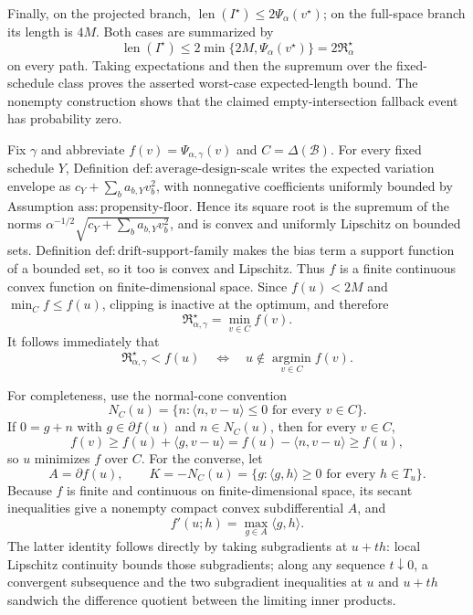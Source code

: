 Finally, on the projected branch,
\(\operatorname{len}(I^\star)\le2\Psi_\alpha(v^\star)\); on the full-space branch its length is \(4M\).  Both cases are summarized by
\[
\operatorname{len}(I^\star)
\le2\min\{2M,\Psi_\alpha(v^\star)\}
=2\mathfrak R_\alpha^\star
\]
on every path.  Taking expectations and then the supremum over the fixed-schedule class proves the asserted worst-case expected-length bound.  The nonempty construction shows that the claimed empty-intersection fallback event has probability zero.

Fix \(\gamma\) and abbreviate \(f(v)=\Psi_{\alpha,\gamma}(v)\) and \(C=\Delta(\mathcal B)\).  For every fixed schedule \(Y\), Definition \(\mathrm{def:average\text{-}design\text{-}scale}\) writes the expected variation envelope as \(c_Y+\sum_ba_{b,Y}v_b^2\), with nonnegative coefficients uniformly bounded by Assumption \(\mathrm{ass:propensity\text{-}floor}\).  Hence its square root is the supremum of the norms
\(\alpha^{-1/2}\sqrt{c_Y+\sum_ba_{b,Y}v_b^2}\), and is convex and uniformly Lipschitz on bounded sets.  Definition \(\mathrm{def:drift\text{-}support\text{-}family}\) makes the bias term a support function of a bounded set, so it too is convex and Lipschitz.  Thus \(f\) is a finite continuous convex function on finite-dimensional space.  Since \(f(u)<2M\) and \(\min_Cf\le f(u)\), clipping is inactive at the optimum, and therefore
\[
\mathfrak R_{\alpha,\gamma}^\star=\min_{v\in C}f(v).
\]
It follows immediately that
\[
\mathfrak R_{\alpha,\gamma}^\star<f(u)
\quad\Longleftrightarrow\quad
u\notin\operatorname*{argmin}_{v\in C}f(v).
\]

For completeness, use the normal-cone convention
\[
N_C(u)=\{n:\langle n,v-u\rangle\le0\text{ for every }v\in C\}.
\]
If \(0=g+n\) with \(g\in\partial f(u)\) and \(n\in N_C(u)\), then for every \(v\in C\),
\[
f(v)\ge f(u)+\langle g,v-u\rangle
=f(u)-\langle n,v-u\rangle\ge f(u),
\]
so \(u\) minimizes \(f\) over \(C\).  For the converse, let
\[
A=\partial f(u),
\qquad
K=-N_C(u)=\{g:\langle g,h\rangle\ge0\text{ for every }h\in T_u\}.
\]
Because \(f\) is finite and continuous on finite-dimensional space, its secant inequalities give a nonempty compact convex subdifferential \(A\), and
\[
f'(u;h)=\max_{g\in A}\langle g,h\rangle.
\]
The latter identity follows directly by taking subgradients at \(u+t h\): local Lipschitz continuity bounds those subgradients; along any sequence \(t\downarrow0\), a convergent subsequence and the two subgradient inequalities at \(u\) and \(u+t h\) sandwich the difference quotient between the limiting inner products.

